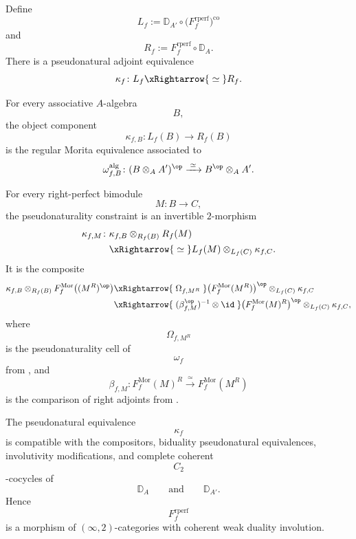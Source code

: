 \begin{proposition}
\label{prop:base-change-morita-duality}
Define
\[
    L_f
    :=
    \mathbb D_{A'}
    \circ
    \bigl(F_f^{\mathrm{rperf}}\bigr)^{\mathrm{co}}
\]
and
\[
    R_f
    :=
    F_f^{\mathrm{rperf}}
    \circ
    \mathbb D_A.
\]
There is a pseudonatural adjoint equivalence
\[
    \kappa_f
    \colon
    L_f
    \xRightarrow{\;\simeq\;}
    R_f.
\]

For every associative $A$-algebra
\[
    B,
\]
the object component
\[
    \kappa_{f,B}
    \colon
    L_f(B)
    \longrightarrow
    R_f(B)
\]
is the regular Morita equivalence associated to
\[
    \omega_{f,B}^{\mathrm{alg}}
    \colon
    (B\otimes_A A')^{\op}
    \xrightarrow{\;\simeq\;}
    B^{\op}\otimes_A A'.
\]

For every right-perfect bimodule
\[
    M
    \colon
    B
    \longrightarrow
    C,
\]
the pseudonaturality constraint is an invertible $2$-morphism
\[
\begin{aligned}
    \kappa_{f,M}
    \colon{}&
    \kappa_{f,B}
    \otimes_{R_f(B)}
    R_f(M)
    \\
    &\xRightarrow{\;\simeq\;}
    L_f(M)
    \otimes_{L_f(C)}
    \kappa_{f,C}.
\end{aligned}
\]
It is the composite
\[
\begin{aligned}
    \kappa_{f,B}
    \otimes_{R_f(B)}
    F_f^{\mathrm{Mor}}
    \bigl(
        (M^R)^{\op}
    \bigr)
    &\xRightarrow{\;\Omega_{f,M^R}\;}
    \bigl(
        F_f^{\mathrm{Mor}}(M^R)
    \bigr)^{\op}
    \otimes_{L_f(C)}
    \kappa_{f,C}
    \\
    &\xRightarrow{
        \;(\beta_{f,M}^{\op})^{-1}
        \otimes
        \id
    \;}
    \bigl(
        F_f^{\mathrm{Mor}}(M)^R
    \bigr)^{\op}
    \otimes_{L_f(C)}
    \kappa_{f,C},
\end{aligned}
\]
where
\[
    \Omega_{f,M^R}
\]
is the pseudonaturality cell of
\[
    \omega_f
\]
from
, and
\[
    \beta_{f,M}
    \colon
    F_f^{\mathrm{Mor}}(M)^R
    \xrightarrow{\;\simeq\;}
    F_f^{\mathrm{Mor}}(M^R)
\]
is the comparison of right adjoints from
.

The pseudonatural equivalence
\[
    \kappa_f
\]
is compatible with the compositors, biduality pseudonatural
equivalences, involutivity modifications, and complete coherent
\[
    C_2
\]
-cocycles of
\[
    \mathbb D_A
    \qquad\text{and}\qquad
    \mathbb D_{A'}.
\]
Hence
\[
    F_f^{\mathrm{rperf}}
\]
is a morphism of $(\infty,2)$-categories with coherent weak duality
involution.
\end{proposition}


